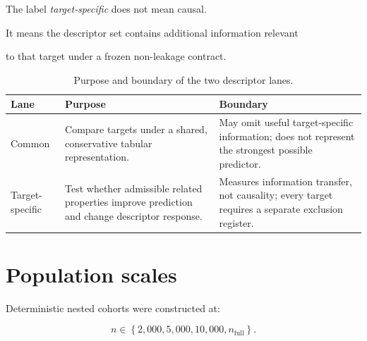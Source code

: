 \documentclass[11pt,a4paper,oneside]{report}
\begin{document}
The label \emph{target-specific} does not mean causal.



It means the descriptor set contains additional information relevant

to that target under a frozen non-leakage contract.





\begin{table}[H]



\centering



\caption{Purpose and boundary of the two descriptor lanes.}



\label{tab:descriptor-lanes}



\begin{tabularx}{\textwidth}{L{0.19\textwidth}
    Y
    Y
}
\toprule
\textbf{Lane}
&
\textbf{Purpose}
&
\textbf{Boundary}
\\
\midrule
Common
&
Compare targets under a shared,
conservative tabular representation.
&
May omit useful target-specific information;
does not represent the strongest possible predictor.
\\
\addlinespace
Target-specific
&
Test whether admissible related properties improve prediction and
change descriptor response.
&
Measures information transfer,
not causality;
every target requires a separate exclusion register.
\\
\bottomrule
\end{tabularx}



\end{table}





\section{Population scales}



Deterministic nested cohorts were constructed at:



\begin{equation}
n
\in
\left\{
2{,}000,
5{,}000,
10{,}000,
n_{\mathrm{full}}
\right\}.
\end{equation}
\end{document}
